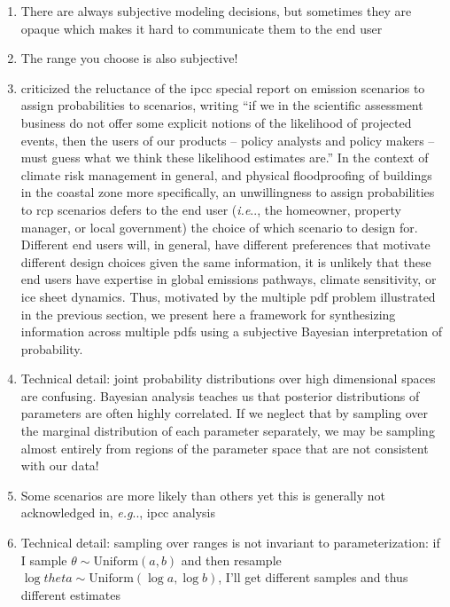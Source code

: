 \documentclass[12pt]{article}
\makeatletter
\DeclareRobustCommand\onedot{\futurelet\@let@token\@onedot}
\def\@onedot{\ifx\@let@token.\else.\null\fi\xspace}
\def\eg{\emph{e.g}\onedot} \def\Eg{\emph{E.g}\onedot}
\def\ie{\emph{i.e}\onedot} \def\Ie{\emph{I.e}\onedot}
\DeclareRobustCommand\onedot{\futurelet\@let@token\@onedot}
\def\@onedot{\ifx\@let@token.\else.\null\fi\xspace}
\def\eg{\emph{e.g}\onedot} \def\Eg{\emph{E.g}\onedot}
\def\ie{\emph{i.e}\onedot} \def\Ie{\emph{I.e}\onedot}
\makeatother
\begin{document}
\begin{enumerate}
    \item There are always subjective  modeling decisions, but sometimes they are opaque which makes it hard to communicate them to the end user
    \item The range you choose is also subjective! \citep{schneider_dangerous:2001,schneider_scenarios:2002}
    \item \citet{schneider_scenarios:2002} criticized the reluctance of the \gls{ipcc} special report on emission scenarios \citep{nakicenovic_scenarios:2000} to assign probabilities to scenarios, writing ``if we in the scientific assessment business do not offer some explicit notions of the likelihood of projected events, then the users of our products -- policy analysts and policy makers -- must guess what we think these likelihood estimates are.''
          In the context of climate risk management in general, and physical floodproofing of buildings in the coastal zone more specifically, an unwillingness to assign probabilities to \gls{rcp} scenarios defers to the end user (\ie, the homeowner, property manager, or local government) the choice of which scenario to design for.
          Different end users will, in general, have different preferences that motivate different design choices given the same information, it is unlikely that these end users have expertise in global emissions pathways, climate sensitivity, or ice sheet dynamics.
          Thus, motivated by the multiple \gls{pdf} problem illustrated in the previous section, we present here a framework for synthesizing information across multiple \glspl{pdf} using a subjective Bayesian interpretation of probability.
    \item Technical detail: joint probability distributions over high dimensional spaces are confusing. Bayesian analysis teaches us that posterior distributions of parameters are often highly correlated. If we neglect that by sampling over the marginal distribution of each parameter separately, we may be sampling almost entirely from regions of the parameter space that are not consistent with our data!
    \item Some scenarios are more likely than others \citep{hausfather_scenarios:2020,ho_scenarios:2019,srikrishnan_probabilistic:2022} yet this is generally not acknowledged in, \eg, \gls{ipcc} analysis
    \item Technical detail: sampling over ranges is not invariant to parameterization: if I sample $\theta \sim \mathrm{Uniform}(a, b)$ and then resample $\log theta \sim \mathrm{Uniform}(\log a, \log b)$, I'll get different samples and thus different estimates
\end{enumerate}
\end{document}
